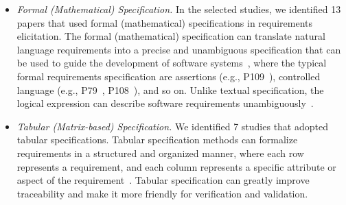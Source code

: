 \begin{itemize}
    \item \textit{Formal (Mathematical) Specification.} In the selected studies, we identified 13 papers that used formal (mathematical) specifications in requirements elicitation. The formal (mathematical) specification can translate natural language requirements into a precise and unambiguous specification that can be used to guide the development of software systems~\cite{definition_formal_specification_01}, where the typical formal requirements specification are assertions (e.g., P109~), controlled language (e.g., P79~, P108~), and so on. Unlike textual specification, the logical expression can describe software requirements unambiguously~\cite{dulac2002use}.

    \item \textit{Tabular (Matrix-based) Specification.} We identified 7 studies that adopted tabular specifications. Tabular specification methods can formalize requirements in a structured and organized manner, where each row represents a requirement, and each column represents a specific attribute or aspect of the requirement~\cite{definition_formal_specification_01}. Tabular specification can greatly improve traceability and make it more friendly for verification and validation.
\end{itemize}






